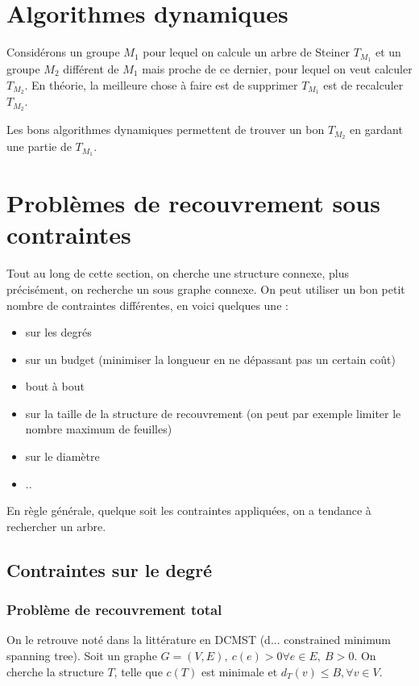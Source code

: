 \documentclass[a4paper,11pt]{thesis}
\begin{document}
\section{Algorithmes dynamiques}

Considérons un groupe $M_1$ pour lequel on calcule un arbre de Steiner $T_{M_1}$ et un groupe $M_2$
différent de $M_1$ mais proche de ce dernier, pour lequel on veut calculer $T_{M_2}$. En théorie, la
meilleure chose à faire est de supprimer $T_{M_1}$ est de recalculer $T_{M_2}$.

Les bons algorithmes dynamiques permettent de trouver un bon $T_{M_2}$ en gardant une partie de
$T_{M_1}$.

\section{Probl\`{e}mes de recouvrement sous contraintes}

Tout au long de cette section, on cherche une structure connexe, plus précisément, on recherche un
sous graphe connexe. On peut utiliser un bon petit nombre de contraintes différentes, en voici
quelques une : \begin{itemize}
    \item sur les degrés
    \item sur un budget (minimiser la longueur en ne dépassant pas un certain coût)
    \item bout à bout
    \item sur la taille de la structure de recouvrement (on peut par exemple limiter le nombre
        maximum de feuilles)
    \item sur le diamètre
    \item ..
\end{itemize}

En règle générale, quelque soit les contraintes appliquées, on a tendance à rechercher un arbre.

\subsection{Contraintes sur le degr\'{e}}

\subsubsection{Probl\`{e}me de recouvrement total}

On le retrouve noté dans la littérature en DCMST (d... constrained minimum spanning tree).
Soit un graphe $G =(V,E),\ c(e) > 0 \forall e \in E,\ B > 0$. On cherche la structure $T$, telle que
$c(T)$ est minimale et $d_T(v) \leq B, \forall v \in V$.
\end{document}
